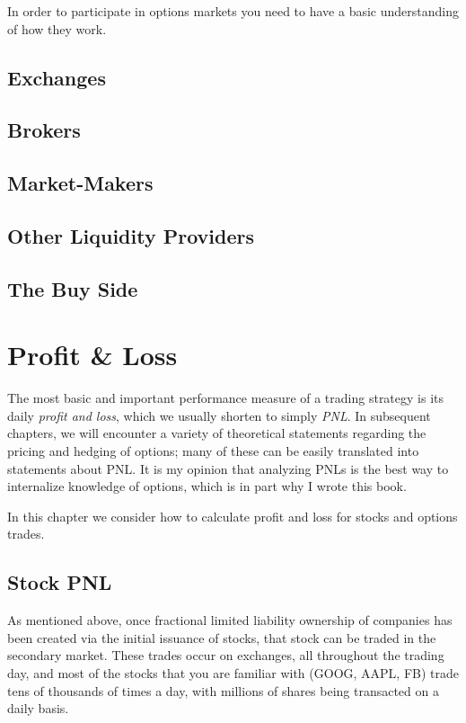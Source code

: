 \documentclass[11pt,]{krantz}
\begin{document}
In order to participate in options markets you need to have a basic understanding of how they work.

\section{Exchanges}\label{exchanges}

\section{Brokers}\label{brokers}

\section{Market-Makers}\label{market-makers}

\section{Other Liquidity Providers}\label{other-liquidity-providers}

\section{The Buy Side}\label{the-buy-side}

\chapter{Profit \& Loss}\label{profit-loss}

The most basic and important performance measure of a trading strategy is its daily \emph{profit and loss}, which we usually shorten to simply \emph{PNL}. In subsequent chapters, we will encounter a variety of theoretical statements regarding the pricing and hedging of options; many of these can be easily translated into statements about PNL. It is my opinion that analyzing PNLs is the best way to internalize knowledge of options, which is in part why I wrote this book.

In this chapter we consider how to calculate profit and loss for stocks and options trades.

\section{Stock PNL}\label{stock-pnl}

As mentioned above, once fractional limited liability ownership of companies has been created via the initial issuance of stocks, that stock can be traded in the secondary market. These trades occur on exchanges, all throughout the trading day, and most of the stocks that you are familiar with (GOOG, AAPL, FB) trade tens of thousands of times a day, with millions of shares being transacted on a daily basis.
\end{document}
